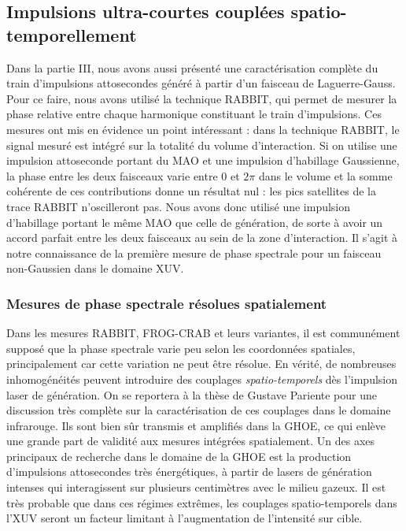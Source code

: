 \subsection{Impulsions ultra-courtes couplées spatio-temporellement}
Dans la partie III, nous avons aussi présenté une caractérisation complète du train d'impulsions attosecondes généré à partir d'un faisceau de Laguerre-Gauss. Pour ce faire, nous avons utilisé la technique RABBIT, qui permet de mesurer la phase relative entre chaque harmonique constituant le train d'impulsions. Ces mesures ont mis en évidence un point intéressant : dans la technique RABBIT, le signal mesuré est intégré sur la totalité du volume d'interaction. Si on utilise une impulsion attoseconde portant du MAO et une impulsion d'habillage Gaussienne, la phase entre les deux faisceaux varie entre 0 et $2\pi$ dans le volume et la somme cohérente de ces contributions donne un résultat nul : les pics satellites de la trace RABBIT n'oscilleront pas. Nous avons donc utilisé une impulsion d'habillage portant le même MAO que celle de génération, de sorte à avoir un accord parfait entre les deux faisceaux au sein de la zone d'interaction. Il s'agit à notre connaissance de la première mesure de phase spectrale pour un faisceau non-Gaussien dans le domaine XUV.

\subsubsection{Mesures de phase spectrale résolues spatialement}
Dans les mesures RABBIT, FROG-CRAB  et leurs variantes, il est communément supposé que la phase spectrale varie peu selon les coordonnées spatiales, principalement car cette variation ne peut être résolue. En vérité, de nombreuses inhomogénéités peuvent introduire des couplages \textit{spatio-temporels} dès l'impulsion laser de génération. On se reportera à la thèse de Gustave Pariente pour une discussion très complète sur la caractérisation de ces couplages dans le domaine infrarouge. Ils sont bien sûr transmis et amplifiés dans la GHOE, ce qui enlève une grande part de validité aux mesures intégrées spatialement. Un des axes principaux de recherche dans le domaine de la GHOE est la production d'impulsions attosecondes très énergétiques, à partir de lasers de génération intenses qui interagissent sur plusieurs centimètres avec le milieu gazeux. Il est très probable que dans ces régimes extrêmes, les couplages spatio-temporels dans l'XUV seront un facteur limitant à l'augmentation de l'intensité sur cible.

